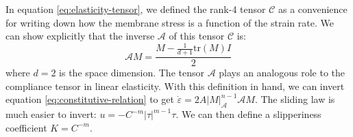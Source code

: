 \documentclass[review,oneside]{igs}
\begin{document}
In equation \eqref{eq:elasticity-tensor}, we defined the rank-4 tensor $\mathscr{C}$ as a convenience for writing down how the membrane stress is a function of the strain rate.
We can show explicitly that the inverse $\mathscr{A}$ of this tensor $\mathscr{C}$ is:
\begin{equation}
    \mathscr{A}M = \frac{M - \frac{1}{d + 1}\text{tr}(M)I}{2}
\end{equation}
where $d = 2$ is the space dimension.
The tensor $\mathscr{A}$ plays an analogous role to the compliance tensor in linear elasticity.
With this definition in hand, we can invert equation \eqref{eq:constitutive-relation} to get $\dot\varepsilon = 2A|M|_{\mathscr{A}}^{n - 1}\mathscr{A}M$.
The sliding law is much easier to invert: $u = -C^{-m}|\tau|^{m - 1}\tau$.
We can then define a slipperiness coefficient $K = C^{-m}$.
\end{document}

